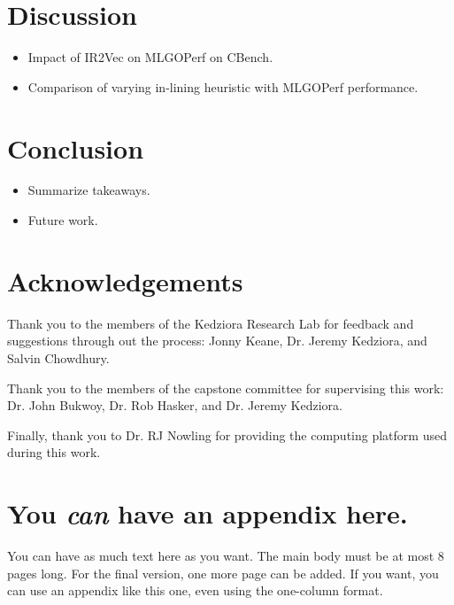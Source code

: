 \documentclass[nohyperref]{article}
\theoremstyle{plain}
\theoremstyle{definition}
\theoremstyle{remark}
\begin{document}
\section{Discussion}
\label{discussion}
\begin{itemize}
\item Impact of IR2Vec on MLGOPerf on CBench\@.
\item Comparison of varying in-lining heuristic with MLGOPerf performance\@.
\end{itemize}

\section{Conclusion}
\label{conclusion}
\begin{itemize}
\item Summarize takeaways\@.
\item Future work\@.
\end{itemize}

\section*{Acknowledgements}

Thank you to the members of the Kedziora Research Lab for feedback and suggestions through out the process: Jonny Keane, Dr. Jeremy Kedziora, and Salvin Chowdhury.

Thank you to the members of the capstone committee for supervising this work: Dr. John Bukwoy, Dr. Rob Hasker, and Dr. Jeremy Kedziora.

Finally, thank you to Dr. RJ Nowling for providing the computing platform used during this work.

\nocite{langley00}





\newpage
\appendix
\onecolumn
\section{You \emph{can} have an appendix here.}

You can have as much text here as you want. The main body must be at most $8$ pages long.
For the final version, one more page can be added.
If you want, you can use an appendix like this one, even using the one-column format.
\end{document}
